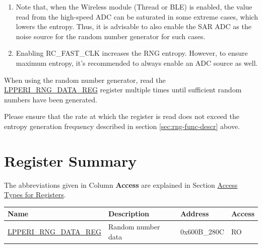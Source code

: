 \documentclass[main\_\_EN.tex]{subfiles}
\begin{document}
\begin{tiplisting}\label{others:rng-note-clock-seed}
\vspace{-2.5em}
\begin{enumerate}
    \item Note that, when the Wireless module (Thread or BLE) is enabled, the value read from the high-speed ADC can be saturated in some extreme cases, which lowers the entropy. Thus, it is advisable to also enable the SAR ADC as the noise source for the random number generator for such cases.
    \item Enabling RC\_FAST\_CLK increases the RNG entropy. However, to ensure maximum entropy, it's recommended to always enable an ADC source as well.
\end{enumerate}
\end{tiplisting}

When using the random number generator, read the \hyperref[regdesc:LPPERIRNGDATAREG]{LPPERI\_RNG\_DATA\_REG} register multiple times until sufficient random numbers have been generated.

Please ensure that the rate at which the register is read does not exceed the entropy generation frequency described in section \ref{sec:rng-func-descr} above.



\hypertarget{rng-reg-summ}{}
\section{Register Summary}
\label{sec:rng-reg-summ}

The abbreviations given in Column \textbf{Access} are explained in Section \hyperref[glossary-access-types]{Access Types for Registers}.

\begin{table}[H]
    \centering
    \setlength{\extrarowheight}{0.3em}
        \begin{tabular}{ | l | l | l | l | }
    \hline
    \rowcolor{lightgray}
    \textbf{Name} & \textbf{Description} & \textbf{Address} & \textbf{Access} \\ \hline
    \hyperref[regdesc:LPPERIRNGDATAREG]{LPPERI\_RNG\_DATA\_REG} & Random number data & 0x600B\_280C & RO \\ \hline
    \end{tabular}
\end{table}
\end{document}
